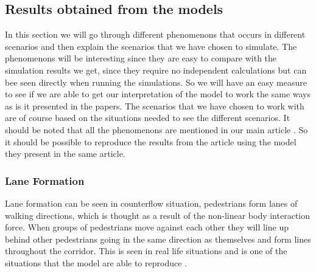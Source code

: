 \subsection{Results obtained from the models}
In this section we will go through different phenomenons that occurs in different scenarios and then explain the scenarios that we have chosen to simulate. The phenomenons will be interesting since they are easy to compare with the simulation results we get, since they require no independent calculations but can bee seen directly when running the simulations. So we will have an easy measure to see if we are able to get our interpretation of the model to work the same ways as is it presented in the papers. The scenarios that we have chosen to work with are of course based on the situations needed to see the different scenarios. It should be noted that all the phenomenons are mentioned in our main article \cite{self-org}. So it should be possible to reproduce the results from the article using the model they present in the same article. 

\subsubsection{Lane Formation}
Lane formation can be seen in counterflow situation, pedestrians form lanes of walking 
directions, which is thought as a result of the non-linear body interaction 
force. When groups of pedestrians move against each other they will line up behind other pedestrians going in the same direction as themselves and form lines throughout the corridor. This is seen in real life situations and is one of the situations that the model are able to reproduce \cite{self-org}. 



